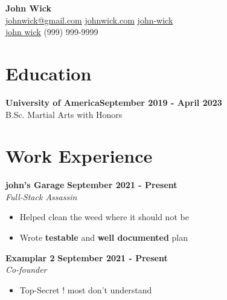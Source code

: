 \documentclass[letterpaper, 11pt]{article}
\newcommand{\iconSpace}{\hspace{1px}}
\newcommand{\bulletSpace}{\vspace{-8pt}}
\newcommand{\hSpace}{\hspace{8px}}
\newcommand{\secStartSpace}{\vspace{3pt}}
\newcommand{\secEndSpace}{\vspace{5pt}}
\newcommand{\spaceCollapse}{\vspace{-5pt}}
\newcommand{\workHeader}[3]{
\noindent \textbf{#1} \hfill \textbf{#3}\\
	\textit{#2}
}
\begin{document}
\begin{center} 
	{\Large \textbf{John Wick}}\\
	\vspace{1px}
	{\footnotesize
		 \href{mailto:john@wick.com}{johnwick@gmail.com} 
		\hSpace
		 \iconSpace \href{johnwick.com}{johnwick.com} 
		\hSpace 
		 \hspace{.1px} \href{https://www.linkedin.com/in/john-wick/}{john-wick} 
		\hSpace
		}\\
	{\footnotesize
		 \iconSpace \href{https://github.com/john-wick}{john wick}
		\hSpace 
		 \iconSpace
		(999) 999-9999
	}
\end{center}
\spaceCollapse


\section{\color{red} \textbf{Education}}
\secStartSpace

\begin{addmargin}[1em]{1em}
	\textbf{University of America}\hfill \textbf{September 2019 - April 2023}\\
	\setlength\parindent{1cm} B.Sc. Martial Arts with Honors
\end{addmargin}
\secEndSpace


\section{\color{red} \textbf{Work Experience}}
\secStartSpace

\begin{addmargin}[1em]{1em}
		
	\noindent \textbf{john's Garage} \hfill \textbf{September 2021 - Present}\\
	\textit{Full-Stack Assassin}
	\spaceCollapse
	\begin{itemize}
		\item Helped clean the weed where it should not be
		      \bulletSpace
		\item Wrote \textbf{testable} and \textbf{well documented} plan
	\end{itemize}
		
	\workHeader{Examplar 2}{Co-founder}{September 2021 - Present} 
	\spaceCollapse
	\begin{itemize}
		\item Top-Secret ! most don't understand
	\end{itemize}
\end{addmargin}
\secEndSpace
\end{document}
